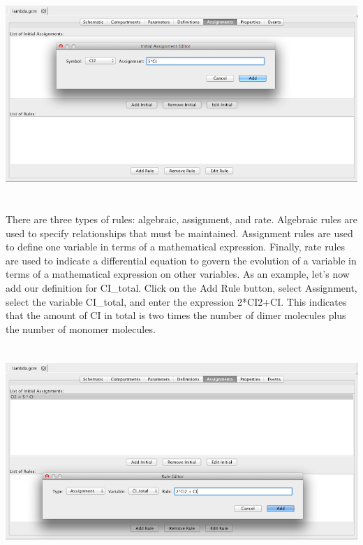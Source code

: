 \documentclass[titlepage,11pt]{article}
\begin{document}
\begin{center}
\includegraphics[height=80mm]{screenshots/initial}
\end{center}

There are three types of rules: algebraic, assignment, and rate.  Algebraic rules are used to specify relationships that must be maintained.  Assignment rules are used to define one variable in terms of a mathematical expression.  Finally, rate rules are used to indicate a differential equation to govern the evolution of a variable in terms of a mathematical expression on other variables.  As an example, let's now add our definition for CI\_total.  Click on the Add Rule button, select Assignment, select the variable CI\_total, and enter the expression 2*CI2+CI.  This indicates that the amount of CI in total is two times the number of dimer molecules plus the number of monomer molecules.

\begin{center}
\includegraphics[height=80mm]{screenshots/rule}
\end{center}
\end{document}
